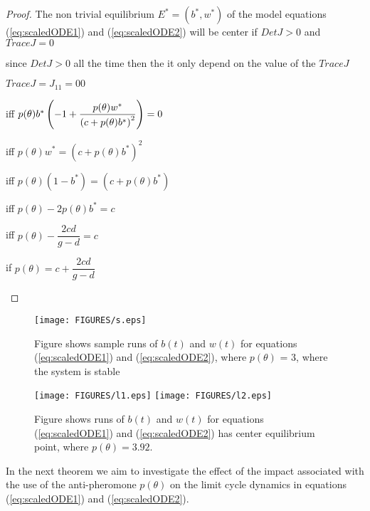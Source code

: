 \documentclass[review]{elsarticle}
\begin{document}
\begin{proof}
  The non trivial equilibrium $E^{\ast }=(b^{\ast },w^{\ast })$ of the
  model equations (\ref{eq:scaledODE1}) and (\ref{eq:scaledODE2}) will
  be center if $DetJ>0$ and $TraceJ=0$

since $DetJ>0$ all the time then the it only depend on the value of the $%
TraceJ$
\begin{center}
$TraceJ=J_{11}=00$

iff $p(\theta )b^{\ast }\left( -1+\dfrac{p(\theta )w^{\ast }}{%
\left( c+p(\theta )b^{\ast }\right) ^{2}}\right) =0$

iff $p(\theta )w^{\ast }=\left( c+p(\theta )b^{\ast }\right)
^{2} $

iff $p(\theta )\left( 1-b^{\ast }\right) =\left( c+p(\theta
)b^{\ast }\right) $

iff $p(\theta )-2p(\theta )b^{\ast }=c$

iff $p(\theta )-\dfrac{2cd}{g-d}=c$

if $p(\theta )=c+\dfrac{2cd}{g-d}$
\end{center}

\end{proof}
\begin{figure}[!htp]
\begin{center}
\texttt{[image: FIGURES/s.eps]}  

\end{center}

\caption{Figure shows sample runs of $b(t)$ and $w(t)$ for equations
  (\ref{eq:scaledODE1}) and (\ref{eq:scaledODE2}), where
  $p(\theta )$ = 3, where the system is stable }
      \label{fig:S}
\end{figure}
\begin{figure}[!htp]
\begin{center}
\texttt{[image: FIGURES/l1.eps]}  
\texttt{[image: FIGURES/l2.eps]}

\end{center}

\caption{Figure shows runs of $b(t)$ and $w(t)$ for equations
  (\ref{eq:scaledODE1}) and (\ref{eq:scaledODE2}) has center
  equilibrium point, where $p(\theta )=3.92$. }
      \label{fig:l1l2}
\end{figure}

In the next theorem we aim to investigate the effect of the impact
associated with the use of the anti-pheromone $p(\theta )$ on
the limit cycle dynamics in equations (\ref{eq:scaledODE1}) and
(\ref{eq:scaledODE2}).
\end{document}
